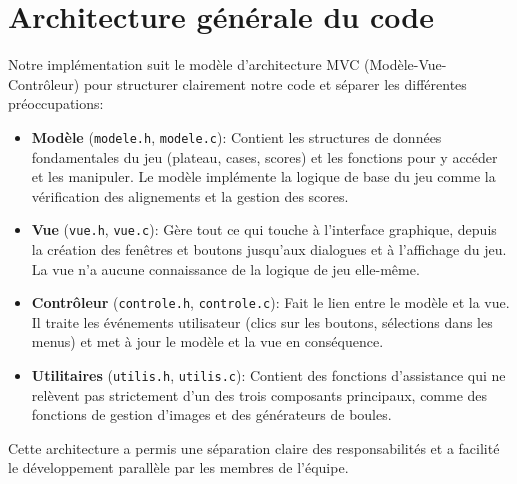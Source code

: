 \section{Architecture générale du code}\label{architecture}

Notre implémentation suit le modèle d'architecture MVC (Modèle-Vue-Contrôleur) pour structurer clairement notre code et séparer les différentes préoccupations:

\begin{itemize}
    \item \textbf{Modèle} (\texttt{modele.h}, \texttt{modele.c}): Contient les structures de données fondamentales du jeu (plateau, cases, scores) et les fonctions pour y accéder et les manipuler. Le modèle implémente la logique de base du jeu comme la vérification des alignements et la gestion des scores.
    
    \item \textbf{Vue} (\texttt{vue.h}, \texttt{vue.c}): Gère tout ce qui touche à l'interface graphique, depuis la création des fenêtres et boutons jusqu'aux dialogues et à l'affichage du jeu. La vue n'a aucune connaissance de la logique de jeu elle-même.
    
    \item \textbf{Contrôleur} (\texttt{controle.h}, \texttt{controle.c}): Fait le lien entre le modèle et la vue. Il traite les événements utilisateur (clics sur les boutons, sélections dans les menus) et met à jour le modèle et la vue en conséquence.
    
    \item \textbf{Utilitaires} (\texttt{utilis.h}, \texttt{utilis.c}): Contient des fonctions d'assistance qui ne relèvent pas strictement d'un des trois composants principaux, comme des fonctions de gestion d'images et des générateurs de boules.
\end{itemize}

Cette architecture a permis une séparation claire des responsabilités et a facilité le développement parallèle par les membres de l'équipe.
